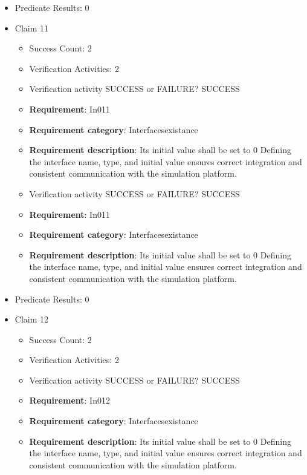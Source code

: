 \documentclass{article}
\begin{document}
\begin{itemize}
\begin{itemize}
				\end{itemize}
				
									    
				\item Predicate Results: 0

  				  \item Claim 11
				\begin{itemize}
			    	\item Success Count: 2 
			    	\item Verification Activities: 2
					\item Verification activity SUCCESS or FAILURE? SUCCESS
		
						\item \textbf{Requirement}: In011 
						\item \textbf{Requirement category}: Interfacesexistance 
						\item \textbf{Requirement description}: Its initial value shall be set to 0 Defining the interface name, type, and initial value ensures correct integration and consistent communication with the simulation platform.
					
					\item Verification activity SUCCESS or FAILURE? SUCCESS
		
						\item \textbf{Requirement}: In011 
						\item \textbf{Requirement category}: Interfacesexistance 
						\item \textbf{Requirement description}: Its initial value shall be set to 0 Defining the interface name, type, and initial value ensures correct integration and consistent communication with the simulation platform.
					
				\end{itemize}
				
									    
				\item Predicate Results: 0

  				  \item Claim 12
				\begin{itemize}
			    	\item Success Count: 2 
			    	\item Verification Activities: 2
					\item Verification activity SUCCESS or FAILURE? SUCCESS
		
						\item \textbf{Requirement}: In012 
						\item \textbf{Requirement category}: Interfacesexistance 
						\item \textbf{Requirement description}: Its initial value shall be set to 0 Defining the interface name, type, and initial value ensures correct integration and consistent communication with the simulation platform.
					

\end{itemize}
\end{itemize}
\end{document}
